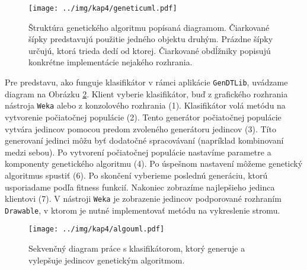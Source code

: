 \begin{figure}[h]
\centering
\centerline{\mbox{\texttt{[image: ../img/kap4/geneticuml.pdf]}}}
\caption{Štruktúra genetického algoritmu popísaná diagramom. Čiarkované šípky predstavujú použitie jedného objektu druhým. Prázdne šípky určujú, ktorá trieda dedí od ktorej. Čiarkované obdĺžniky popisujú konkrétne implementácie nejakého rozhrania.}\label{fig:geneticuml}
\end{figure}

Pre predstavu, ako funguje klasifikátor v rámci aplikácie \verb|GenDTLib|, uvádzame 
diagram na Obrázku \ref{fig:clasuml}. Klient vyberie klasifikátor, buď z grafického rozhrania nástroja \verb|Weka| alebo z konzolového rozhrania (1). Klasifikátor volá metódu na vytvorenie počiatočnej populácie (2). Tento generátor počiatočnej populácie vytvára jedincov pomocou predom zvoleného generátoru jedincov (3). Títo generovaní jedinci môžu byť dodatočné spracovávaní (napríklad kombinovaní medzi sebou). Po vytvorení počiatočnej populácie nastavíme parametre a komponenty genetického algoritmu (4). Po úspešnom nastavení môžeme genetický algoritmus spustiť (6). Po skončení vyberieme poslednú generáciu, ktorú usporiadame podľa fitness funkcií. Nakoniec zobrazíme najlepšieho jedinca klientovi (7). V nástroji \verb|Weka| je zobrazenie jedincov podporované rozhraním \verb|Drawable|, v ktorom je nutné implementovať metódu na vykreslenie stromu.

\begin{figure}[h]
\centering
\centerline{\mbox{\texttt{[image: ../img/kap4/algouml.pdf]}}}
\caption{Sekvenčný diagram práce s klasifikátorom, ktorý generuje a vylepšuje jedincov genetickým algoritmom.}\label{fig:clasuml}
\end{figure}
